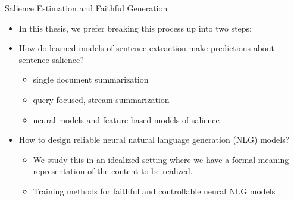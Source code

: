 \begin{frame}{Salience Estimation and Faithful Generation}
\begin{itemize}
    
\item In this thesis, we prefer breaking this process up into two steps:

\vspace{10pt}

\begin{center}

\end{center}

\item<2-> How do learned models of sentence extraction make predictions 
    about sentence salience?
    \begin{itemize}
            \item single document summarization
            \item query focused, stream summarization
            \item neural models and feature based models of salience
    \end{itemize}
    \vspace{10pt}
\item<3->  How to design reliable neural natural language generation (NLG)
    models?
    \begin{itemize}
        \item We study this in an idealized setting where we have a formal
            meaning representation of the content to be realized.
        \item Training methods for faithful and controllable neural NLG models
  \end{itemize}

\end{itemize}

\end{frame}

